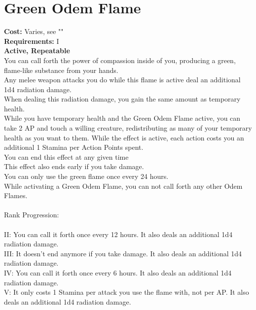 \section{Green Odem Flame}\label{perk:greenOdemFlame}
\textbf{Cost:} Varies, see ""\\
\textbf{Requirements:} I\\
\textbf{Active, Repeatable}\\
You can call forth the power of compassion inside of you, producing a green, flame-like substance from your hands.\\
Any melee weapon attacks you do while this flame is active deal an additional 1d4 radiation damage.\\
When dealing this radiation damage, you gain the same amount as temporary health.\\
While you have temporary health and the Green Odem Flame active, you can take 2 AP and touch a willing creature, redistributing as many of your temporary health as you want to them.
While the effect is active, each action costs you an additional 1 Stamina per Action Points spent.\\
You can end this effect at any given time\\
This effect also ends early if you take damage.\\
You can only use the green flame once every 24 hours.\\
While activating a Green Odem Flame, you can not call forth any other Odem Flames.\\
\\
Rank Progression:\\
\\
II: You can call it forth once every 12 hours.
It also deals an additional 1d4 radiation damage.\\
III: It doesn't end anymore if you take damage.
It also deals an additional 1d4 radiation damage.\\
IV: You can call it forth once every 6 hours.
It also deals an additional 1d4 radiation damage.\\
V: It only costs 1 Stamina per attack you use the flame with, not per AP.
It also deals an additional 1d4 radiation damage.\\